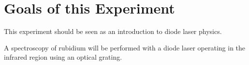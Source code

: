 \section{Goals of this Experiment}
\label{sec:Goals}

This experiment should be seen as an introduction to diode laser physics.

A spectroscopy of rubidium will be performed with a diode laser operating in the infrared region using an optical grating.